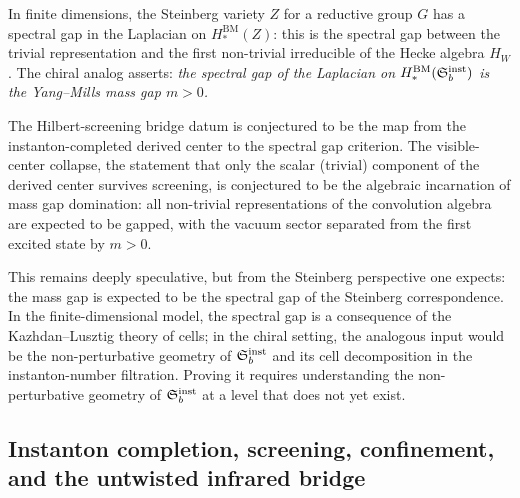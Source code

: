\begin{conjecture}
\label{prop:mass-gap-spectral-gap}
In finite dimensions, the Steinberg variety $Z$ for a reductive group $G$ has a spectral gap
in the Laplacian on $H_*^{\mathrm{BM}}(Z)$: this is the spectral gap between the trivial
representation and the first non-trivial irreducible of the Hecke algebra $H_W$.
The chiral analog asserts:
\emph{the spectral gap of the Laplacian on $H_*^{\mathrm{BM}}(\mathfrak{S}_b^{\mathrm{inst}})$
is the Yang--Mills mass gap $m > 0$.}
\end{conjecture}

\begin{remark}
\label{rem:hilbert-screening-bridge}
The Hilbert-screening bridge datum is conjectured to be the map from the instanton-completed derived center
to the spectral gap criterion.
The visible-center collapse, the statement that only the scalar (trivial) component
of the derived center survives screening, is conjectured to be the algebraic incarnation of mass gap domination:
all non-trivial representations of the convolution algebra are expected to be gapped, with
the vacuum sector separated from the first excited state by $m > 0$.
\end{remark}

\begin{remark}
\label{rem:steinberg-mass-gap-frontier}
This remains deeply speculative, but from the Steinberg perspective one expects:
the mass gap is expected to be the spectral gap of the Steinberg correspondence.
In the finite-dimensional model, the spectral gap is a consequence of the
Kazhdan--Lusztig theory of cells; in the chiral setting, the analogous input
would be the non-perturbative geometry of $\mathfrak{S}_b^{\mathrm{inst}}$ and
its cell decomposition in the instanton-number filtration.
Proving it requires understanding the non-perturbative geometry of $\mathfrak{S}_b^{\mathrm{inst}}$
at a level that does not yet exist.
\end{remark}


\subsection{Instanton completion, screening, confinement, and the untwisted infrared bridge}
\label{subsec:instanton-screening-ir-bridge}


